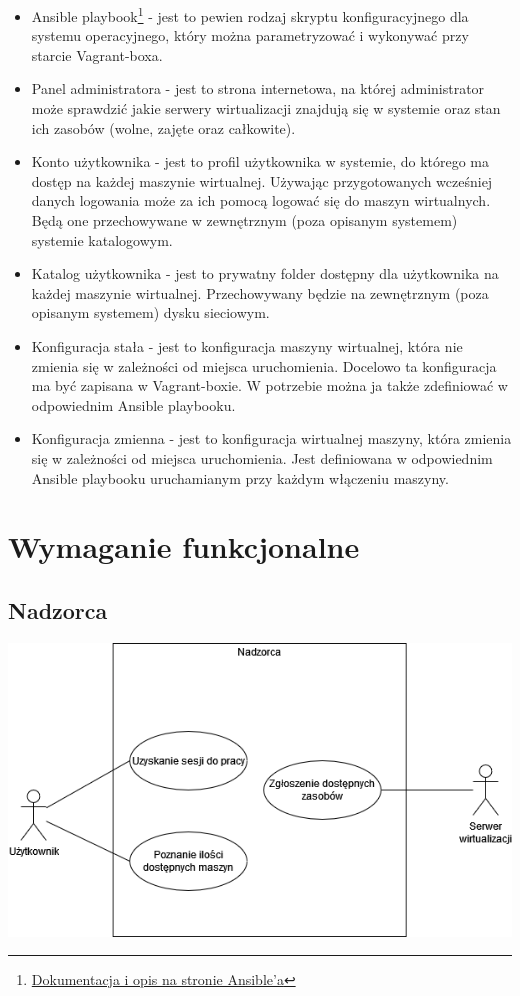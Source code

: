 \documentclass[12pt]{article}
\begin{document}
\begin{itemize}
	\item Ansible playbook\footnote{\href{https://www.redhat.com/en/topics/automation/what-is-an-ansible-playbook\#example-of-ansible-playbook}{Dokumentacja i opis na stronie Ansible'a}} - jest to pewien rodzaj skryptu konfiguracyjnego dla systemu operacyjnego, który można parametryzować i wykonywać przy starcie Vagrant-boxa.
	\item Panel administratora - jest to strona internetowa, na której administrator może sprawdzić jakie serwery wirtualizacji znajdują się w systemie oraz stan ich zasobów (wolne, zajęte oraz całkowite). 
	\item Konto użytkownika - jest to profil użytkownika w systemie, do którego ma dostęp na każdej maszynie wirtualnej. Używając przygotowanych wcześniej danych logowania może za ich pomocą logować się do maszyn wirtualnych. Będą one przechowywane w zewnętrznym (poza opisanym systemem) systemie katalogowym.
	\item Katalog użytkownika - jest to prywatny folder dostępny dla użytkownika na każdej maszynie wirtualnej. Przechowywany będzie na zewnętrznym (poza opisanym systemem) dysku sieciowym.
	\item Konfiguracja stała - jest to konfiguracja maszyny wirtualnej, która nie zmienia się w zależności od miejsca uruchomienia. Docelowo ta konfiguracja ma być zapisana w Vagrant-boxie. W potrzebie można ja także zdefiniować w odpowiednim Ansible playbooku.
	\item Konfiguracja zmienna - jest to konfiguracja wirtualnej maszyny, która zmienia się w zależności od miejsca uruchomienia. Jest definiowana w odpowiednim Ansible playbooku uruchamianym przy każdym włączeniu maszyny.
\end{itemize}

\section{Wymaganie funkcjonalne}
\subsection{Nadzorca}
\includegraphics[width=\textwidth]{../diagrams/use_cases/overseer.png}
\end{document}
